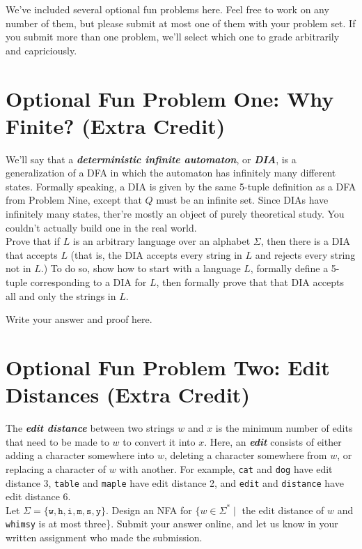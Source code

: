 \documentclass{article}
\renewcommand{\(}{\left(}
\renewcommand{\)}{\right)}
\theoremstyle{plain}
\theoremstyle{plain}
\theoremstyle{definition}
\renewcommand{\emph}[1]{\textit{\textbf{#1}}}
\newcommand{\ttt}[1]{\texttt{#1}}
\begin{document}
\pagebreak 

We've included several optional fun problems here. Feel free to work on any number of them, but please submit at most one of them with your problem set. If you submit more than one problem, we'll select which one to grade arbitrarily and capriciously. \smiley

\section*{Optional Fun Problem One: Why Finite? (Extra Credit)}

We'll say that a \emph{deterministic infinite automaton}, or \emph{DIA}, is a generalization of a DFA in which the automaton has infinitely many different states. Formally speaking, a DIA is given by the same 5-tuple definition as a DFA from Problem Nine, except that $Q$ must be an infinite set. Since DIAs have infinitely many states, ther're mostly an object of purely theoretical study. You couldn't actually build one in the real world. \\

Prove that if $L$ is an arbitrary language over an alphabet $\Sigma$, then there is a DIA that accepts $L$ (that is, the DIA accepts every string in $L$ and rejects every string not in $L$.) To do so, show how to start with a language $L$, formally define a 5-tuple corresponding to a DIA for $L$, then formally prove that that DIA accepts all and only the strings in $L$.

\begin{shaded}
Write your answer and proof here. 
\end{shaded}

\section*{Optional Fun Problem Two: Edit Distances (Extra Credit)}

The \emph{edit distance} between two strings $w$ and $x$ is the minimum number of edits that need to be made to $w$ to convert it into $x$. Here, an \emph{edit} consists of either adding a character somewhere into $w$, deleting a character
somewhere from $w$, or replacing a character of $w$ with another. For example, \ttt{cat} and \ttt{dog} have edit
distance 3, \ttt{table} and \ttt{maple} have edit distance 2, and \ttt{edit} and \ttt{distance} have edit distance 6. \\

Let $\Sigma = \{\ttt{w}, \ttt{h}, \ttt{i}, \ttt{m}, \ttt{s}, \ttt{y}\}$. Design an NFA for $\{w \in \Sigma^* \mid$ the edit distance of $w$ and \ttt{whimsy} is at most
three\}. Submit your answer online, and let us know in your written assignment who made the submission.
\end{document}
